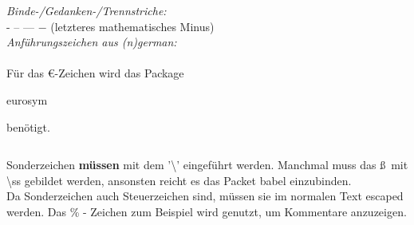 \begin{frame}
\begin{columns}
\begin{column}{0.5\textwidth}
\textit{Binde-\slash Gedanken-\slash Trennstriche:} \\
- -- --- $-$ (letzteres mathematisches Minus) \\

\textit{Anführungszeichen aus (n)german:} \\
\glqq \grqq \flqq \frqq\\[5mm]
Für das \euro -Zeichen wird das Package \begin{ttfamily}eurosym\end{ttfamily}
benötigt.\\

\end{column}
\end{columns}

\medskip
\footnotesize Sonderzeichen \textbf{müssen} mit dem '\color{nounibaredI}\textbackslash \color{black}' eingeführt werden.
Manchmal muss das \ss ~mit \color{nounibaredI} \textbackslash ss \color{black}gebildet werden, ansonsten reicht es das Packet {\ttfamily babel} einzubinden.\\
Da Sonderzeichen auch Steuerzeichen sind, müssen sie im normalen Text escaped werden. Das \% - Zeichen zum Beispiel wird genutzt, um Kommentare anzuzeigen.
\end{frame}
